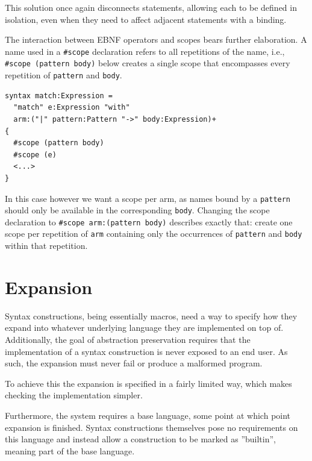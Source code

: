 \documentclass{kththesis}
\begin{document}
This solution once again disconnects statements, allowing each to be defined in isolation, even when they need to affect adjacent statements with a binding.

The interaction between EBNF operators and scopes bears further elaboration. A name used in a \texttt{#scope} declaration refers to all repetitions of the name, i.e., \texttt{#scope (pattern body)} below creates a single scope that encompasses every repetition of \texttt{pattern} and \texttt{body}.

\begin{verbatim}
syntax match:Expression =
  "match" e:Expression "with"
  arm:("|" pattern:Pattern "->" body:Expression)+
{
  #scope (pattern body)
  #scope (e)
  <...>
}
\end{verbatim}

In this case however we want a scope per arm, as names bound by a \texttt{pattern} should only be available in the corresponding \texttt{body}. Changing the scope declaration to \texttt{#scope arm:(pattern body)} describes exactly that: create one scope per repetition of \texttt{arm} containing only the occurrences of \texttt{pattern} and \texttt{body} within that repetition.

\section{Expansion} \label{sec:design-implementation}

Syntax constructions, being essentially macros, need a way to specify how they expand into whatever underlying language they are implemented on top of. Additionally, the goal of abstraction preservation requires that the implementation of a syntax construction is never exposed to an end user. As such, the expansion must never fail or produce a malformed program.

To achieve this the expansion is specified in a fairly limited way, which makes checking the implementation simpler.

Furthermore, the system requires a base language, some point at which point expansion is finished. Syntax constructions themselves pose no requirements on this language and instead allow a construction to be marked as ''builtin'', meaning part of the base language.
\end{document}
